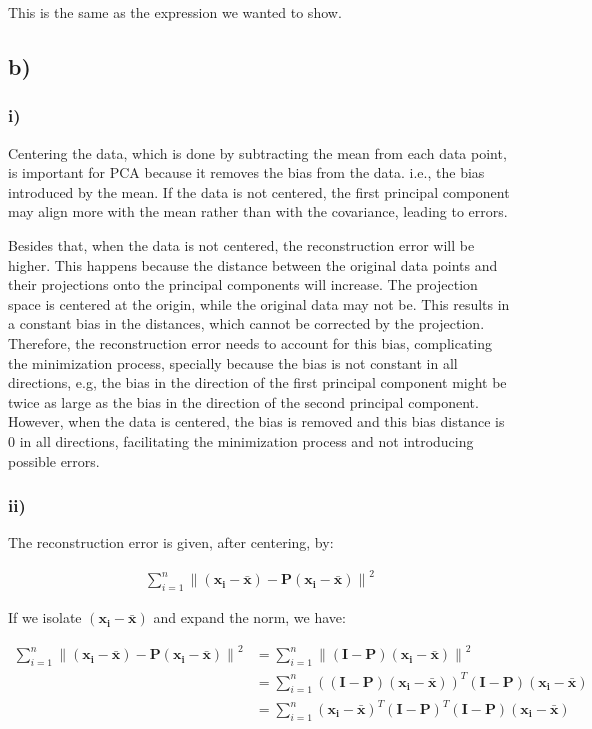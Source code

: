 \documentclass[12pt,a4paper,oneside]{paper}
\begin{document}
This is the same as the expression we wanted to show.

\newpage
\subsection*{b)}

\subsubsection*{i)}

Centering the data, which is done by subtracting the mean from each data point, is important for PCA because it
removes the bias from the data. i.e., the bias introduced by the mean.
If the data is not centered, the first principal component may align more with the mean rather than with the covariance, leading to errors.

Besides that, when the data is not centered, the reconstruction error will be higher. This happens because the distance
between the original data points and their projections onto the principal components will increase. The projection space
is centered at the origin, while the original data may not be. This results in a constant bias in the distances,
which cannot be corrected by the projection. Therefore, the reconstruction error needs to account for this bias,
complicating the minimization process, specially because the bias is not constant in all directions, e.g, the bias in
the direction of the first principal component might be twice as large as the bias in the direction of the second principal component.
However, when the data is centered, the bias is removed and this bias distance is 0 in all directions, 
facilitating the minimization process and not introducing possible errors.

\subsubsection*{ii)}

The reconstruction error is given, after centering, by:

\begin{align*}
    \sum_{i=1}^{n} \left\| \left( \bm{x_i} - \bm{\bar{x}} \right) - \bm{P} \left( \bm{x_i} - \bm{\bar{x}} \right) \right\|^2 
\end{align*}

If we isolate $\left( \bm{x_i} - \bm{\bar{x}} \right)$ and expand the norm, we have:

\begin{align*}
    \sum_{i=1}^{n} \left\| \left( \bm{x_i} - \bm{\bar{x}} \right) - \bm{P} \left( \bm{x_i} - \bm{\bar{x}} \right) \right\|^2 &= \sum_{i=1}^{n} \left\| (\bm{I} - \bm{P}) \left( \bm{x_i} - \bm{\bar{x}} \right) \right\|^2 \\
    &= \sum_{i=1}^{n} \left( (\bm{I} - \bm{P}) \left( \bm{x_i} - \bm{\bar{x}} \right) \right)^T (\bm{I} - \bm{P}) \left( \bm{x_i} - \bm{\bar{x}} \right) \\
    &= \sum_{i=1}^{n} \left( \bm{x_i} - \bm{\bar{x}} \right)^T (\bm{I} - \bm{P})^T (\bm{I} - \bm{P}) \left( \bm{x_i} - \bm{\bar{x}} \right) \\
\end{align*}
\end{document}
